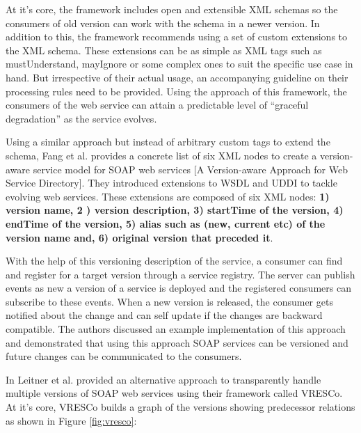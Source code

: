\documentclass[runningheads,a4paper]{llncs}
\begin{document}
At it’s core, the framework includes open and extensible XML schemas so the consumers of old version can work with the schema in a newer version. In addition to this, the framework recommends using a set of custom extensions to the XML schema. These extensions can be as simple as XML tags such as mustUnderstand, mayIgnore or some complex ones to suit the specific use case in hand. But irrespective of their actual usage, an accompanying guideline on their processing rules need to be provided. Using the approach of this framework, the consumers of the web service can attain a predictable level of ``graceful degradation'' as the service evolves.

Using a similar approach but instead of arbitrary custom tags to extend the schema, Fang et al. provides a concrete list of six XML nodes to create a version-aware service model for SOAP web services [A Version-aware Approach for Web Service Directory]. They introduced extensions to WSDL and UDDI to tackle evolving web services. These extensions are composed of six XML nodes: \textbf{1) version name, 2 ) version description, 3) startTime of the version, 4) endTime of the version, 5) alias such as (new, current etc) of the version name and, 6) original version that preceded it}.

With the help of this versioning description of the service, a consumer can find and register for a target version through a service registry. The server can publish events as new a version of a service is deployed and the registered consumers can subscribe to these events. When a new version is released, the consumer gets notified about the change and can self update if the changes are backward compatible. The authors discussed an example implementation of this approach and demonstrated that using this approach SOAP services can be versioned and future changes can be communicated to the consumers.

In \cite{leitner2008end} Leitner et al. provided an alternative approach to transparently handle multiple versions of SOAP web services using their framework called VRESCo. At it’s core, VRESCo builds a graph of the versions showing predecessor relations as shown in Figure \ref{fig:vresco}:
\end{document}
